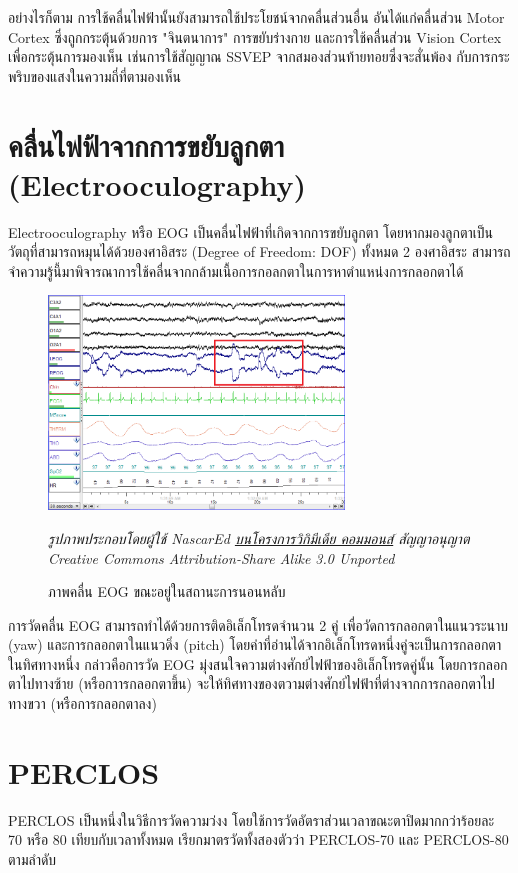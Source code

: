 อย่างไรก็ตาม การใช้คลื่นไฟฟ้านั้นยังสามารถใช้ประโยชน์จากคลื่นส่วนอื่น อันได้แก่คลื่นส่วน Motor Cortex ซึ่งถูกกระตุ้นด้วยการ "จินตนาการ"
การขยับร่างกาย และการใช้คลื่นส่วน Vision Cortex เพื่อกระตุ้นการมองเห็น เช่นการใช้สัญญาณ SSVEP จากสมองส่วนท้ายทอยซึ่งจะสั่นพ้อง
กับการกระพริบของแสงในความถี่ที่ตามองเห็น

\section{คลื่นไฟฟ้าจากการขยับลูกตา (Electrooculography)}
Electrooculography หรือ EOG เป็นคลื่นไฟฟ้าที่เกิดจากการขยับลูกตา โดยหากมองลูกตาเป็นวัตถุที่สามารถหมุนได้ด้วยองศาอิสระ (Degree of Freedom: DOF)
ทั้งหมด 2 องศาอิสระ สามารถจำความรู้นี้มาพิจารณาการใช้คลื่นจากกล้ามเนื้อการกอลกตาในการหาตำแหน่งการกลอกตาได้ \cite{bulling-eog}

\begin{figure}[h]
	\centering
	\includegraphics[width=0.7\textwidth]{images/rem_eog.png}
	\caption{ภาพคลื่น EOG ขณะอยู่ในสถานะการนอนหลับ}
	\hspace{\linewidth}
	\textit{รูปภาพประกอบโดยผู้ใช้ NascarEd \href{https://commons.wikimedia.org/wiki/file:sleep\_stage\_rem.png}{บนโครงการวิกิมีเดีย คอมมอนส์}
		สัญญาอนุญาต Creative Commons Attribution-Share Alike 3.0 Unported}
\end{figure}

การวัดคลื่น EOG สามารถทำได้ด้วยการติดอิเล็กโทรดจำนวน 2 คู่ เพื่อวัดการกลอกตาในแนวระนาบ (yaw) และการกลอกตาในแนวดิ่ง (pitch)
โดยค่าที่อ่านได้จากอิเล็กโทรดหนึ่งคู่จะเป็นการกลอกตาในทิศทางหนึ่ง กล่าวคือการวัด EOG มุ่งสนใจความต่างศักย์ไฟฟ้าของอิเล็กโทรดคู่นั้น
โดยการกลอกตาไปทางซ้าย (หรือกาารกลอกตาขึ้น) จะให้ทิศทางของตวามต่างศักย์ไฟฟ้าที่ต่างจากการกลอกตาไปทางขวา (หรือการกลอกตาลง)

\section{PERCLOS}
PERCLOS \cite{perclos} เป็นหนึ่งในวิธีการวัดความว่งง โดยใช้การวัดอัตราส่วนเวลาขณะตาปิดมากกว่าร้อยละ 70 หรือ 80 เทียบกับเวลาทั้งหมด เรียกมาตรวัดทั้งสองตัวว่า PERCLOS-70 และ PERCLOS-80 ตามลำดับ

